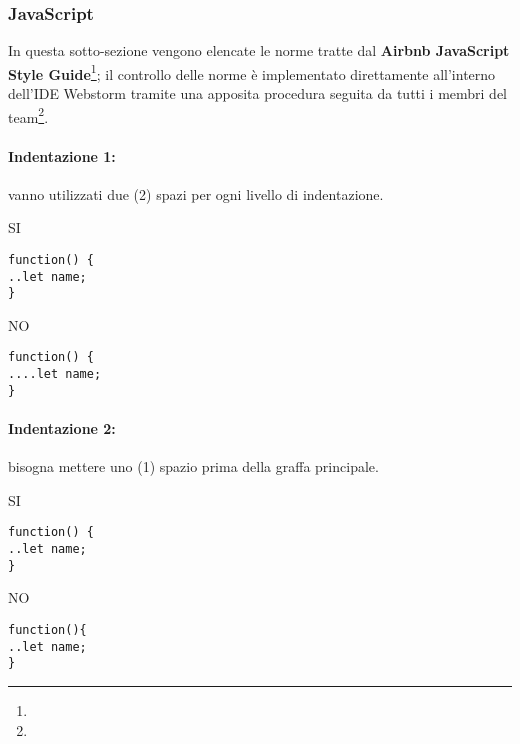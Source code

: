 \documentclass[../ProcessiPrimari.tex]{subfiles}
\begin{document}
	
	\subsubsection{JavaScript}
	In questa sotto-sezione vengono elencate le norme tratte dal \textbf{Airbnb JavaScript Style Guide}\footnote{}; il controllo delle norme è implementato direttamente all'interno dell'IDE Webstorm tramite una apposita procedura seguita da tutti i membri del team\footnote{}.
	
	\paragraph*{Indentazione 1: }
	vanno utilizzati due (2) spazi per ogni livello di indentazione.
	
	\begin{center}{
	\begin{minipage}{4cm}
		{\begin{center}SI\end{center}}
		\begin{Verbatim}[frame=single]
function() {
..let name;
}
		\end{Verbatim}
	\end{minipage}
	\hfil
	\begin{minipage}{4cm}
		{\begin{center}NO\end{center}}
		\begin{Verbatim}[frame=single]
function() {
....let name;
}
		\end{Verbatim}
	\end{minipage}
	}
	\end{center}
	
	\paragraph*{Indentazione 2: }
	bisogna mettere uno (1) spazio prima della graffa principale.	
	\begin{center}{	
	\begin{minipage}{4cm}
		{\begin{center}SI\end{center}}
		\begin{Verbatim}[frame=single]
function() {
..let name;
}
		\end{Verbatim}
	\end{minipage}
	\hfil
	\begin{minipage}{4cm}
		{\begin{center}NO\end{center}}
		\begin{Verbatim}[frame=single]
function(){
..let name;
}
		\end{Verbatim}
	\end{minipage}
	}
	\end{center}	
\end{document}
